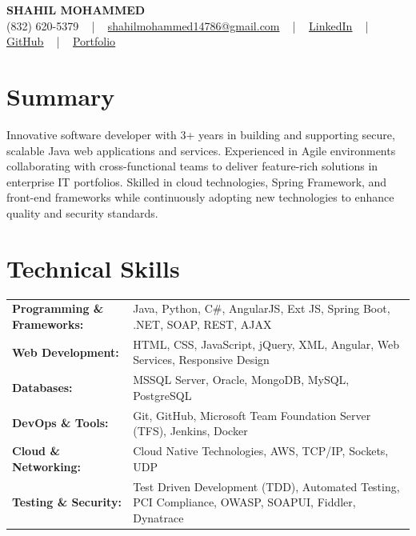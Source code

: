 \documentclass[letterpaper,11pt]{article}
\begin{document}
\begin{center}
    {\fontsize{14pt}{12pt}\selectfont \textbf{\MakeUppercase{Shahil Mohammed}}}\\ \vspace{2pt}
    \fontsize{10pt}{12pt}\selectfont (832) 620-5379 ~ | ~ \href{mailto:shahilmohammed14786@gmail.com}{shahilmohammed14786@gmail.com} ~ | ~  
    \href{https://www.linkedin.com/in/shahil-mohammed-9652931a1/}{\color{blue}\underline{LinkedIn}}  ~ | ~ 
    \href{https://github.com/freakbeast14}{\color{blue}\underline{GitHub}} ~ | ~ 
    \href{https://shahil-mohammed.netlify.app/}{\color{blue}\underline{Portfolio}}
    \vspace{-8pt}
\end{center}

\section{Summary}
\fontsize{9pt}{10pt}\selectfont
Innovative software developer with 3+ years in building and supporting secure, scalable Java web applications and services. Experienced in Agile environments collaborating with cross-functional teams to deliver feature-rich solutions in enterprise IT portfolios. Skilled in cloud technologies, Spring Framework, and front-end frameworks while continuously adopting new technologies to enhance quality and security standards.
 \vspace{-5pt}
 
\section{Technical Skills}
        \vspace{-14pt}
        \begin{table}[h]
            \fontsize{9pt}{10pt}\selectfont
            \begin{tabular}{p{0.3\linewidth} p{0.7\linewidth}}
                \textbf{Programming \& Frameworks:} & Java, Python, C\#, AngularJS, Ext JS, Spring Boot, .NET, SOAP, REST, AJAX \\
                \textbf{Web Development:} & HTML, CSS, JavaScript, jQuery, XML, Angular, Web Services, Responsive Design \\
                \textbf{Databases:} & MSSQL Server, Oracle, MongoDB, MySQL, PostgreSQL \\
                \textbf{DevOps \& Tools:} & Git, GitHub, Microsoft Team Foundation Server (TFS), Jenkins, Docker \\
                \textbf{Cloud \& Networking:} & Cloud Native Technologies, AWS, TCP/IP, Sockets, UDP \\
                \textbf{Testing \& Security:} & Test Driven Development (TDD), Automated Testing, PCI Compliance, OWASP, SOAPUI, Fiddler, Dynatrace \\
            \end{tabular}
        \end{table}
 \vspace{-15pt}
 
\end{document}
